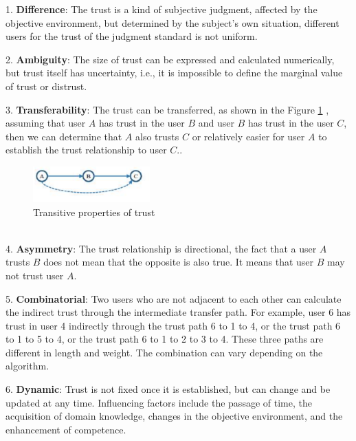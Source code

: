 1.
\textbf{Difference}:
The trust is a kind of subjective judgment, affected by the objective environment, but 
determined by the subject's own situation, different users for the trust of the judgment 
standard is not uniform\cite{b15}.

2.
\textbf{Ambiguity}:
The size of trust can be expressed and calculated numerically, but trust itself has 
uncertainty, i.e., it is impossible to define the marginal value of trust or distrust\cite{b15}.

3.
\textbf{Transferability}:
The trust can be transferred, as shown in the Figure \ref{Fig.2: Transitive properties of trust}
, assuming that user $A$ has 
trust in the user $B$ and user $B$ has trust in the user $C$, then we can determine that $A$ also trusts 
$C$ or relatively easier for user $A$ to establish the trust relationship to user $C$.\cite{b15}.

\begin{figure}[H] %
    \centering %
    \includegraphics[width=0.4\textwidth]{figures/relation.png} %
    \caption{Transitive properties of trust} %
    \label{Fig.2: Transitive properties of trust} %
    \end{figure}
\\

4.
\textbf{Asymmetry}:
The trust relationship is directional, the fact that a user $A$ trusts $B$ does not mean 
that the opposite is also true. It means that user $B$ may not trust user $A$\cite{b15}.

5.
\textbf{Combinatorial}:
Two users who are not adjacent to each other can calculate the indirect trust through 
the intermediate transfer path. For example, user 6 has trust in user 4 indirectly through the 
trust path 6 to 1 to 4, or the trust path 6 to 1 to 5 to 4, or the trust path 6 to 1 to 2 to 
3 to 4. These three paths are different in length and weight.
The combination can vary depending on the algorithm\cite{b15}.

6.
\textbf{Dynamic}:
Trust is not fixed once it is established, but can change and be updated at any time. 
Influencing factors include the passage of time, the acquisition of domain knowledge, 
changes in the objective environment, and the enhancement of competence\cite{b15}.


